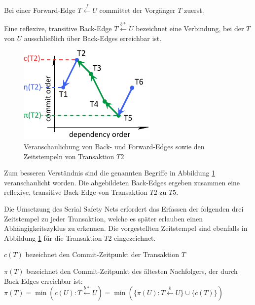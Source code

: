 \begin{Definition}
	Bei einer \textcolor{my-blue}{Forward-Edge} $T\xleftarrow{f} U$ committet der Vorgänger $T$ zuerst.
\end{Definition}

\begin{Definition}
	Eine \textcolor{my-green}{reflexive, transitive Back-Edge} $T\xleftarrow{b*} U$ bezeichnet eine Verbindung, bei der $T$ von $U$ ausschließlich über Back-Edges erreichbar ist.
\end{Definition}

\begin{figure}
	\includegraphics{img/Figure_2_1.pdf}
	\caption{Veranschaulichung von \textcolor{my-green}{Back}- und \textcolor{my-blue}{Forward-Edges} sowie den Zeitstempeln von Transaktion $T2$}
	\label{fig:back_forward}
\end{figure}

Zum besseren Verständnis sind die genannten Begriffe in Abbildung \ref{fig:back_forward} veranschaulicht worden.
Die abgebildeten Back-Edges ergeben zusammen eine reflexive, transitive Back-Edge von Transaktion $T2$ zu $T5$.

Die Umsetzung des Serial Safety Nets erfordert das Erfassen der folgenden drei Zeitstempel zu jeder Transaktion, welche es später erlauben einen Abhängigkeitszyklus zu erkennen.
Die vorgestellten Zeitstempel sind ebenfalls in Abbildung \ref{fig:back_forward} für die Transaktion $T2$ eingezeichnet.

\begin{Definition}
	\textcolor{my-red}{$c(T)$} bezeichnet den Commit-Zeitpunkt der Transaktion $T$
\end{Definition}

\begin{Definition}
	\textcolor{my-green}{$\pi (T)$} bezeichnet den Commit-Zeitpunkt des ältesten Nachfolgers, der durch Back-Edges erreichbar ist:\\		
	$\pi (T)=\min (c(U):T\xleftarrow{b*}U)=\min (\{\pi (U):T\xleftarrow{b}U\}\cup \{c(T)\})$
\end{Definition}

